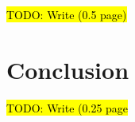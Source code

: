 \documentclass[letterpaper,twocolumn,10pt]{article}
\newcommand{\TODO}[1]{\hl{TODO: #1}\xspace}
\begin{document}
\TODO{Write (0.5 page)}


\section{Conclusion}

\TODO{Write (0.25 page}

%



\small

\end{document}
